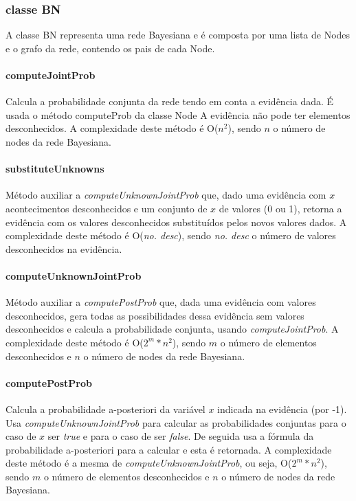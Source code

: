\documentclass[12pt,a4paper]{article}
\begin{document}
\begin{multicols}{2}
	\subsubsection{classe BN}
	A classe BN representa uma rede Bayesiana e é composta por uma lista de Nodes e o grafo da rede, contendo os pais de cada Node.
	\paragraph{computeJointProb}
	Calcula a probabilidade conjunta da rede tendo em conta a evidência dada. É usada o método computeProb da classe Node
	A evidência não pode ter elementos desconhecidos.
	A complexidade deste método é O($n^2$), sendo $n$ o número de nodes da rede Bayesiana.
	\paragraph{substituteUnknowns}
	Método auxiliar a \textit{computeUnknownJointProb} que, dado uma evidência com $x$ acontecimentos desconhecidos e um conjunto de $x$ de valores (0 ou 1), retorna a evidência com os valores desconhecidos substituídos pelos novos valores dados.
	A complexidade deste método é O(\textit{no. desc}), sendo \textit{no. desc} o número de valores desconhecidos na evidência.
	\paragraph{computeUnknownJointProb}
	Método auxiliar a \textit{computePostProb} que, dada uma evidência com valores desconhecidos, gera todas as possibilidades dessa evidência sem valores desconhecidos e calcula a probabilidade conjunta, usando \textit{computeJointProb}.
	A complexidade deste método é O($2^m * n^2$), sendo $m$ o número de elementos desconhecidos e $n$ o número de nodes da rede Bayesiana. 
	\paragraph{computePostProb}
	Calcula a probabilidade a-posteriori da variável $x$ indicada na evidência (por -1). Usa \textit{computeUnknownJointProb} para calcular as probabilidades conjuntas para o caso de $x$ ser \textit{true} e para o caso de ser \textit{false}.
	De seguida usa a fórmula da probabilidade a-posteriori para a calcular e esta é retornada.
	A complexidade deste método é a mesma de \textit{computeUnknownJointProb}, ou seja, O($2^m * n^2$), sendo $m$ o número de elementos desconhecidos e $n$ o número de nodes da rede Bayesiana.

\end{multicols}
\end{document}
